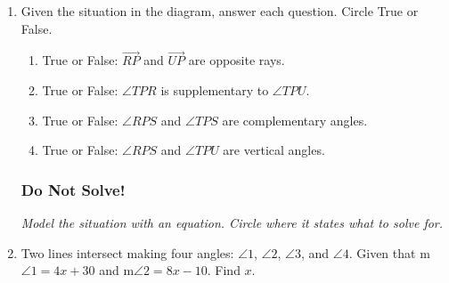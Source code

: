 \begin{enumerate}
\item Given the situation in the diagram, answer each question. Circle True or False. \vspace{0.25cm}
  \begin{center}
  \end{center}
  \begin{enumerate}
    \item True or False: $\overrightarrow{RP}$ and $\overrightarrow{UP}$ are opposite rays.
    \item True or False: $\angle TPR$ is supplementary to $\angle TPU$.
    \item True or False: $\angle RPS$ and $\angle TPS$ are complementary angles.
    \item True or False: $\angle RPS$ and $\angle TPU$ are vertical angles.
  \end{enumerate}

\newpage
\subsubsection*{Do Not Solve!}
\emph{Model the situation with an equation. Circle where it states what to solve for.} 
\item Two lines intersect making four angles: $\angle 1$, $\angle 2$, $\angle 3$, and $\angle 4$. Given that m$\angle 1= 4x+30$ and m$\angle 2=8x-10$. Find $x$.
  \begin{flushright}
  \end{flushright}
  

\end{enumerate}

